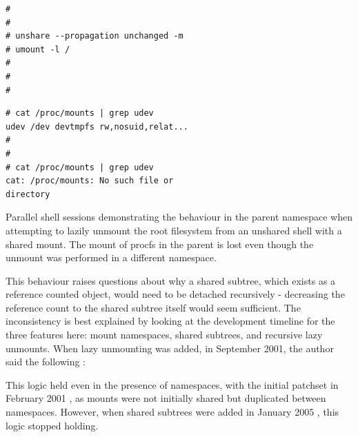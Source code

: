 \documentclass[12pt,a4paper,twoside]{report}
\begin{document}
\begin{listing}
\begin{minipage}{.49\textwidth}

\begin{verbatim}
#
#
# unshare --propagation unchanged -m
# umount -l /
#
#
#
\end{verbatim}

\end{minipage}
\hfill
\begin{minipage}{.49\textwidth}

\begin{verbatim}
# cat /proc/mounts | grep udev
udev /dev devtmpfs rw,nosuid,relat...
#
#
# cat /proc/mounts | grep udev
cat: /proc/mounts: No such file or
directory
\end{verbatim}

\end{minipage}

\caption{Parallel shell sessions demonstrating the behaviour in the parent namespace when attempting to lazily unmount the root filesystem from an unshared shell with a shared mount. The mount of procfs in the parent is lost even though the unmount was performed in a different namespace.}
\label{lst:unshare-umount-lazy}
\end{listing}

This behaviour raises questions about why a shared subtree, which exists as a reference counted object, would need to be detached recursively - decreasing the reference count to the shared subtree itself would seem sufficient. The inconsistency is best explained by looking at the development timeline for the three features here: mount namespaces, shared subtrees, and recursive lazy unmounts. When lazy unmounting was added, in September 2001, the author said the following \citep{viro_patch_2001}:


This logic held even in the presence of namespaces, with the initial patchset in February 2001 \citep{viro_patchcft_2001}, as mounts were not initially shared but duplicated between namespaces. However, when shared subtrees were added in January 2005 \citep{viro_rfc_2005}, this logic stopped holding.
\end{document}
